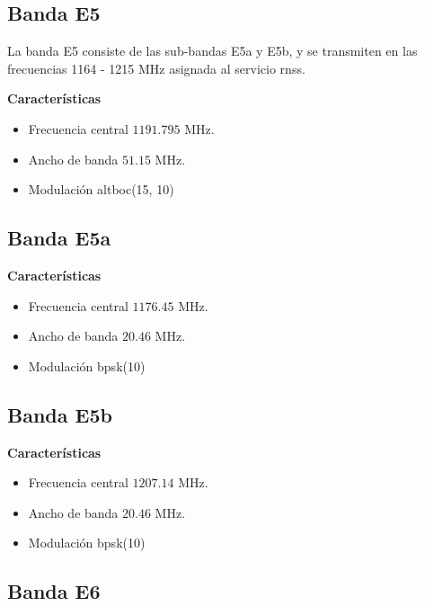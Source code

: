 \subsection{Banda E5}

\begin{justify}
    La banda E5 consiste de las sub-bandas E5a y E5b, y  se transmiten en las frecuencias 1164 - 1215 MHz asignada al servicio
    \gls{rnss}.

    \textbf{Características}
    \begin{itemize}
        \item Frecuencia central $1191.795$ MHz.
        \item Ancho de banda $51.15$ MHz.
        \item Modulación \acrshort{altboc}(15, 10)
    \end{itemize}
\end{justify}

\subsection{Banda E5a}

\begin{justify}
    \textbf{Características}
    \begin{itemize}
        \item Frecuencia central $1176.45$ MHz.
        \item Ancho de banda $20.46$ MHz.
        \item Modulación \gls{bpsk}(10)
    \end{itemize}
\end{justify}

\subsection{Banda E5b}

\begin{justify}
    \textbf{Características}
    \begin{itemize}
        \item Frecuencia central $1207.14$ MHz.
        \item Ancho de banda $20.46$ MHz.
        \item Modulación \gls{bpsk}(10)
    \end{itemize}
\end{justify}

\subsection{Banda E6}

